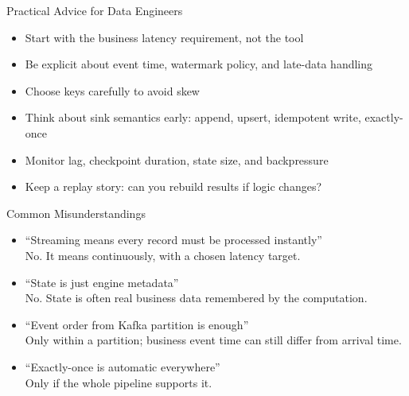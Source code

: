 \documentclass[aspectratio=169]{beamer}
\begin{document}
\begin{frame}{Practical Advice for Data Engineers}
\begin{itemize}
    \item Start with the business latency requirement, not the tool
    \item Be explicit about event time, watermark policy, and late-data handling
    \item Choose keys carefully to avoid skew
    \item Think about sink semantics early: append, upsert, idempotent write, exactly-once
    \item Monitor lag, checkpoint duration, state size, and backpressure
    \item Keep a replay story: can you rebuild results if logic changes?
\end{itemize}
\end{frame}

\begin{frame}{Common Misunderstandings}
\begin{itemize}
    \item ``Streaming means every record must be processed instantly'' \\
    \hspace{0.4cm}No. It means continuously, with a chosen latency target.
    \item ``State is just engine metadata'' \\
    \hspace{0.4cm}No. State is often real business data remembered by the computation.
    \item ``Event order from Kafka partition is enough'' \\
    \hspace{0.4cm}Only within a partition; business event time can still differ from arrival time.
    \item ``Exactly-once is automatic everywhere'' \\
    \hspace{0.4cm}Only if the whole pipeline supports it.
\end{itemize}
\end{frame}
\end{document}
